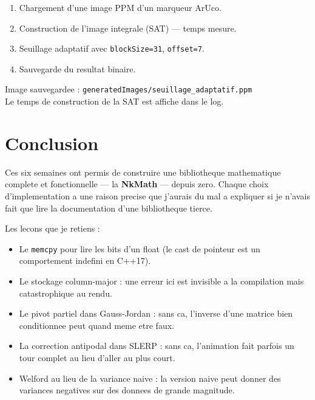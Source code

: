 \documentclass[12pt,a4paper]{report}
\newcommand{\code}[1]{\texttt{\textcolor{PrimaryBlue}{#1}}}
\newcommand{\NKM}{\textbf{\textcolor{PrimaryBlue}{NkMath}}}
\begin{document}
\begin{tpbox}
\begin{enumerate}
  \item Chargement d'une image PPM d'un marqueur ArUco.
  \item Construction de l'image integrale (SAT) --- temps mesure.
  \item Seuillage adaptatif avec \code{blockSize=31}, \code{offset=7}.
  \item Sauvegarde du resultat binaire.
\end{enumerate}
Image sauvegardee : \code{generatedImages/seuillage\_adaptatif.ppm}\\
Le temps de construction de la SAT est affiche dans le log.
\end{tpbox}

\chapter*{Conclusion}

Ces six semaines ont permis de construire une bibliotheque mathematique complete et fonctionnelle --- la \NKM{} --- depuis zero. Chaque choix d'implementation a une raison precise que j'aurais du mal a expliquer si je n'avais fait que lire la documentation d'une bibliotheque tierce.

\medskip

Les lecons que je retiens :

\begin{itemize}
  \item Le \code{memcpy} pour lire les bits d'un float (le cast de pointeur est un comportement indefini en C++17).
  \item Le stockage column-major : une erreur ici est invisible a la compilation mais catastrophique au rendu.
  \item Le pivot partiel dans Gauss-Jordan : sans ca, l'inverse d'une matrice bien conditionnee peut quand meme etre faux.
  \item La correction antipodal dans SLERP : sans ca, l'animation fait parfois un tour complet au lieu d'aller au plus court.
  \item Welford au lieu de la variance naive : la version naive peut donner des variances negatives sur des donnees de grande magnitude.
\end{itemize}
\end{document}

